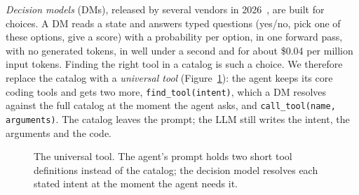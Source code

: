 \emph{Decision models} (DMs), released by several vendors in 2026~\citep{typesafejev,msd1,openrouterdecisions},
are built for choices. A DM reads a state and answers typed questions (yes/no, pick one of these options, give a
score) with a probability per option, in one forward pass, with no generated tokens, in well under a second
and for about \$0.04 per million input tokens. Finding the right tool in a catalog is such a choice. We
therefore replace the catalog with a \emph{universal tool} (Figure~\ref{fig:universal}): the agent keeps its
core coding tools and gets two more, \texttt{find\_tool(intent)}, which a DM resolves against the full catalog
at the moment the agent asks, and \texttt{call\_tool(name, arguments)}. The catalog leaves the prompt; the LLM
still writes the intent, the arguments and the code.

\begin{figure}[t]
\centering
{}
\caption{The universal tool. The agent's prompt holds two short tool definitions instead of the catalog; the
decision model resolves each stated intent at the moment the agent needs it.}
\label{fig:universal}
\end{figure}

